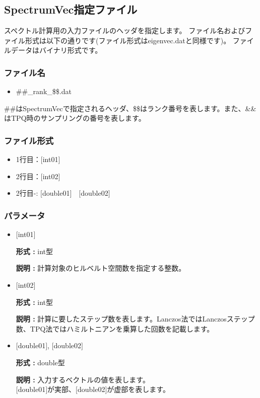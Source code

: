 \newpage
\subsection{{SpectrumVec指定ファイル}}
\label{Subsec:spectrumvec}
スペクトル計算用の入力ファイルのヘッダを指定します。
ファイル名およびファイル形式は以下の通りです(ファイル形式はeigenvec.datと同様です)。
ファイルデータはバイナリ形式です。

\subsubsection{ファイル名}
\begin{itemize}
   \item{\#\#\_rank\_\$\$.dat}   
\end{itemize}
  \#\#はSpectrumVecで指定されるヘッダ、\$\$はランク番号を表します。また、\&\&はTPQ時のサンプリングの番号を表します。

\subsubsection{ファイル形式}
 \begin{itemize}
   \item  1行目：$[$int01$]$
   \item  2行目：$[$int02$]$
   \item  2行目-: $[$double01$]$~~$[$double02$]$
  \end{itemize}
\subsubsection{パラメータ}
 \begin{itemize}

  \item  $[$int01$]$

 {\bf 形式 :} int型

{\bf 説明 :} 計算対象のヒルベルト空間数を指定する整数。

  \item  $[$int02$]$

 {\bf 形式 :} int型

{\bf 説明 :} { 計算に要したステップ数を表します。Lanczos法ではLanczosステップ数、TPQ法ではハミルトニアンを乗算した回数を記載します。}
 
 \item  $[$double01$]$, $[$double02$]$

 {\bf 形式 :} double型 

{\bf 説明 :} 入力するベクトルの値を表します。\\
$[$double01$]$が実部、$[$double02$]$が虚部を表します。\\
\end{itemize}

